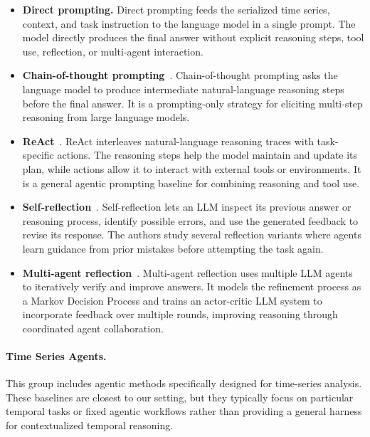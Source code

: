\begin{itemize}
    \item \textbf{Direct prompting.}
    Direct prompting feeds the serialized time series, context, and task instruction to the language model in a single prompt. The model directly produces the final answer without explicit reasoning steps, tool use, reflection, or multi-agent interaction.

    \item \textbf{Chain-of-thought prompting}~\citep{DBLP:conf/nips/Wei0SBIXCLZ22}.
    Chain-of-thought prompting asks the language model to produce intermediate natural-language reasoning steps before the final answer. It is a prompting-only strategy for eliciting multi-step reasoning from large language models.

    \item \textbf{ReAct}~\citep{DBLP:conf/iclr/YaoZYDSN023}. 
    ReAct interleaves natural-language reasoning traces with task-specific actions. The reasoning steps help the model maintain and update its plan, while actions allow it to interact with external tools or environments. It is a general agentic prompting baseline for combining reasoning and tool use.

    \item \textbf{Self-reflection}~\citep{DBLP:journals/corr/abs-2405-06682}.
    Self-reflection lets an LLM inspect its previous answer or reasoning process, identify possible errors, and use the generated feedback to revise its response. The authors study several reflection variants where agents learn guidance from prior mistakes before attempting the task again.

    \item \textbf{Multi-agent reflection}~\citep{DBLP:conf/icml/YuanX25}.
    Multi-agent reflection uses multiple LLM agents to iteratively verify and
improve answers. It models the refinement process as a Markov Decision Process and trains an actor-critic LLM system to incorporate feedback over multiple rounds, improving reasoning through coordinated agent collaboration.
\end{itemize}

\paragraph{Time Series Agents.}
This group includes agentic methods specifically designed for time-series
analysis. These baselines are closest to our setting, but they typically focus
on particular temporal tasks or fixed agentic workflows rather than providing a
general harness for contextualized temporal reasoning.

